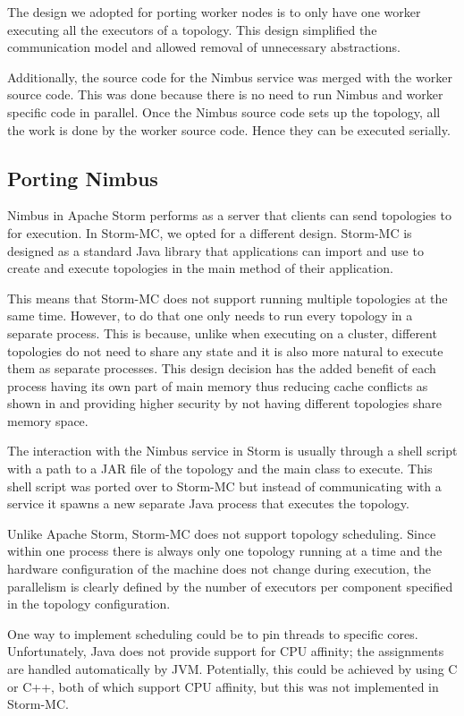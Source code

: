 \documentclass[bsc,deptreport,twoside,singlespacing,normalheadings,parskip]{infthesis}\usepackage[]{graphicx}\usepackage[]{color}
\begin{document}
The design we adopted for porting worker nodes is to only have one worker executing all the executors of a topology. This design simplified the communication model and allowed removal of unnecessary abstractions.

Additionally, the source code for the Nimbus service was merged with the worker source code. This was done because there is no need to run Nimbus and worker specific code in parallel. Once the Nimbus source code sets up the topology, all the work is done by the worker source code. Hence they can be executed serially.

\subsection{Porting Nimbus}

Nimbus in Apache Storm performs as a server that clients can send topologies to for execution. In Storm-MC, we opted for a different design. Storm-MC is designed as a standard Java library that applications can import and use to create and execute topologies in the main method of their application.

This means that Storm-MC does not support running multiple topologies at the same time. However, to do that one only needs to run every topology in a separate process. This is because, unlike when executing on a cluster, different topologies do not need to share any state and it is also more natural to execute them as separate processes. This design decision has the added benefit of each process having its own part of main memory thus reducing cache conflicts as shown in \cite{Chandra:2005:PIC:1042442.1043432} and providing higher security by not having different topologies share memory space.

The interaction with the Nimbus service in Storm is usually through a shell script with a path to a JAR file of the topology and the main class to execute. This shell script was ported over to Storm-MC but instead of communicating with a service it spawns a new separate Java process that executes the topology.

Unlike Apache Storm, Storm-MC does not support topology scheduling. Since within one process there is always only one topology running at a time and the hardware configuration of the machine does not change during execution, the parallelism is clearly defined by the number of executors per component specified in the topology configuration.

One way to implement scheduling could be to pin threads to specific cores. Unfortunately, Java does not provide support for CPU affinity; the assignments are handled automatically by JVM. Potentially, this could be achieved by using C or C++, both of which support CPU affinity, but this was not implemented in Storm-MC.
\end{document}
